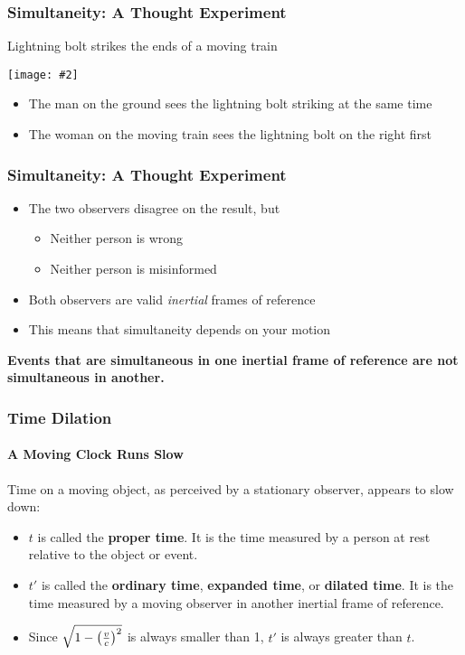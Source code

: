 \documentclass[12pt,compress,aspectratio=169]{beamer}
\newcommand{\pic}[2]{\texttt{[image: \#2]}}
\newcommand{\bigsqrt}{\ensuremath\sqrt{1-\left(\frac{v}{c}\right)^2}}
\newcommand{\eq}[2]{\vspace{#1}{\Large\begin{displaymath}#2\end{displaymath}}}
\begin{document}
\begin{frame}
  \frametitle{Simultaneity: A Thought Experiment}
  Lightning bolt strikes the ends of a moving train
  \begin{center}
    \pic{.5}{graphics/87-1-1024x673.png}
  \end{center}
  \vspace{-0.1in}
  \begin{itemize}
  \item The man on the ground sees the lightning bolt striking at the same time
  \item The woman on the moving train sees the lightning bolt on the right first
  \end{itemize}
\end{frame}

\begin{frame}
  \frametitle{Simultaneity: A Thought Experiment}
  \begin{itemize}
  \item The two observers disagree on the result, but
    \begin{itemize}
    \item Neither person is wrong
    \item Neither person is misinformed
    \end{itemize}
  \item Both observers are valid \emph{inertial} frames of reference
  \item This means that simultaneity depends on your motion
  \end{itemize}
  
  \vspace{.2in}\textbf{Events that are simultaneous in one inertial frame of
    reference are not simultaneous in another.}
\end{frame}



\begin{frame}
  \frametitle{Time Dilation}
  \framesubtitle{A Moving Clock Runs Slow}

  Time on a moving object, as perceived by a stationary observer, appears to
  slow down:
  
  \eq{-.3in}{
    \boxed{t' =\frac{t}{\bigsqrt}=\gamma t}
  }
  \begin{itemize}
  \item $t$ is called the \textbf{proper time}. It is the time measured
    by a person at rest relative to the object or event.
  \item $t'$ is called the \textbf{ordinary time}, \textbf{expanded time}, or
    \textbf{dilated time}. It is the time measured by a moving observer in
    another inertial frame of reference.
  \item Since $\bigsqrt$ is always smaller than 1, $t'$ is always greater than
    $t$.
  \end{itemize}
\end{frame}
\end{document}

